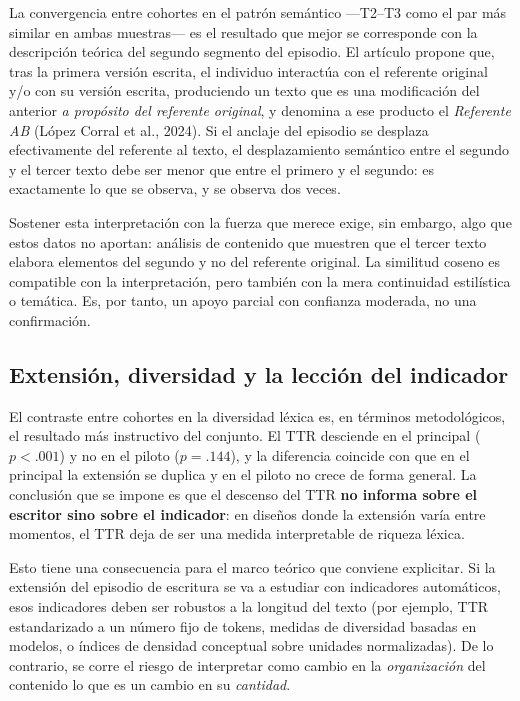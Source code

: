 \documentclass[12pt]{article}
\begin{document}
La convergencia entre cohortes en el patrón semántico —T2--T3 como el par más similar en ambas
muestras— es el resultado que mejor se corresponde con la descripción teórica del segundo
segmento del episodio. El artículo propone que, tras la primera versión escrita, el individuo
interactúa con el referente original y/o con su versión escrita, produciendo un texto que es
una modificación del anterior \emph{a propósito del referente original}, y denomina a ese
producto el \emph{Referente AB} (López Corral et al., 2024). Si el anclaje del episodio se
desplaza efectivamente del referente al texto, el desplazamiento semántico entre el segundo y
el tercer texto debe ser menor que entre el primero y el segundo: es exactamente lo que se
observa, y se observa dos veces.

Sostener esta interpretación con la fuerza que merece exige, sin embargo, algo que estos datos
no aportan: análisis de contenido que muestren que el tercer texto elabora elementos del
segundo y no del referente original. La similitud coseno es compatible con la interpretación,
pero también con la mera continuidad estilística o temática. Es, por tanto, un apoyo parcial con
confianza moderada, no una confirmación.

\subsection{Extensión, diversidad y la lección del indicador}

El contraste entre cohortes en la diversidad léxica es, en términos metodológicos, el resultado
más instructivo del conjunto. El TTR desciende en el principal ($p < .001$) y no en el piloto
($p = .144$), y la diferencia coincide con que en el principal la extensión se duplica y en el
piloto no crece de forma general. La conclusión que se impone es que el descenso del TTR
\textbf{no informa sobre el escritor sino sobre el indicador}: en diseños donde la extensión
varía entre momentos, el TTR deja de ser una medida interpretable de riqueza léxica.

Esto tiene una consecuencia para el marco teórico que conviene explicitar. Si la extensión del
episodio de escritura se va a estudiar con indicadores automáticos, esos indicadores deben ser
robustos a la longitud del texto (por ejemplo, TTR estandarizado a un número fijo de tokens,
medidas de diversidad basadas en modelos, o índices de densidad conceptual sobre unidades
normalizadas). De lo contrario, se corre el riesgo de interpretar como cambio en la
\emph{organización} del contenido lo que es un cambio en su \emph{cantidad}.
\end{document}
